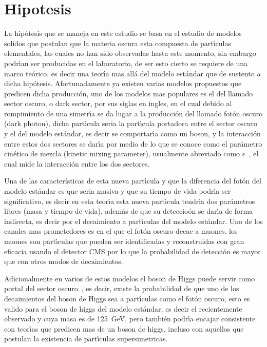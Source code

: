 \chapter{Hipotesis}

La hip\'otesis que se maneja en este estudio se basa en el estudio de modelos solidos que postulan que la materia oscura esta compuesta de part\'{\i}culas elementales, las cuales no han sido observadas hasta este momento, sin embargo podr\'{\i}an ser producidas en el laboratorio, de ser esto cierto se requiere de una marco te\'orico, es decir una teor\'{\i}a mas all\'a del modelo est\'andar que de sustento a dicha hip\'otesis. Afortunadamente ya existen varias modelos propuestos que predicen dicha producci\'on, uno de los modelos mas populares es el del llamado sector oscuro, o dark sector, por sus siglas en ingles, en el cual debido al rompimiento de una simetr\'{\i}a se da lugar a la producci\'on del llamado fot\'on oscuro (dark photon), dicha part\'{\i}cula seria la part\'{\i}cula portadora entre el sector oscuro y el del modelo est\'andar, es decir se comportar\'{\i}a como un boson, y la interacci\'on entre estos dos sectores se dar\'{\i}a por medio de lo que se conoce como el par\'ametro cin\'etico de mezcla (kinetic mixing parameter), usualmente abreviado como $\epsilon$~\cite{LB}, el cual mide la interacci\'on entre los dos sectores.

Una de las características de esta nueva part\'{\i}cula y que la diferencia del fot\'on del modelo est\'andar es que seria masiva y que su tiempo de vida podr\'{\i}a ser significativo, es decir en esta teor\'{\i}a esta nueva part\'{\i}cula tendr\'{\i}a dos par\'ametros libres (masa y tiempo de vida), adem\'as de que su deteccio\'on se dar\'{\i}a de forma indirecta, es decir por el decaimiento a part\'{\i}culas del modelo est\'andar.  Uno de los canales mas prometedores es en el que el fot\'on oscuro decae a muones. los muones son part\'{\i}culas que pueden ser identificadas y reconstruidas con gran eficacia usando el detector CMS por lo que la probabilidad de detecci\'on es mayor que con otros modos de decaimientos.

Adicionalmente en varios de estos modelos el boson de Higgs puede servir como portal del sector oscuro~\cite{Arcadi:2019lka}, es decir, existe la probabilidad de que uno de los decaimientos del boson de Higgs sea a part\'{\i}culas como el fot\'on oscuro, esto es valido para el boson de higgs del modelo est\'andar, es decir el recientemente observado y cuya masa es de 125~GeV, pero tambi\'en podr\'{\i}a encajar consistente con teor\'{\i}as que predicen mas de un boson de higgs, incluso con aquellos que postulan la existencia de part\'{\i}culas supersimetricas.




